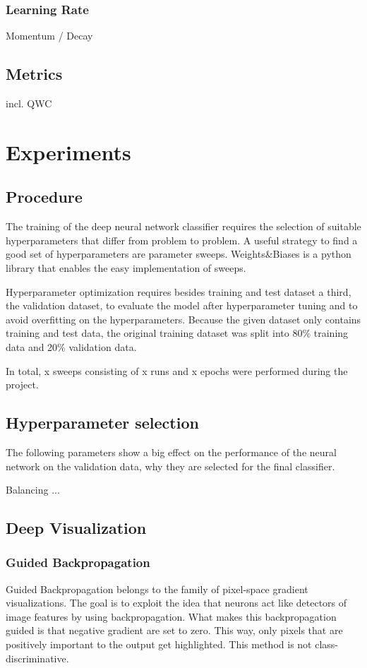 \documentclass{article}
\begin{document}
\subsubsection{Learning Rate}
Momentum / Decay

\subsection{Metrics}
incl. QWC
\section{Experiments}
\subsection{Procedure}
The training of the deep neural network classifier requires the selection of suitable hyperparameters that differ from
problem to problem. A useful strategy to find a good set of hyperparameters are parameter sweeps. Weights\&Biases is a 
python library that enables the easy implementation of sweeps. 

Hyperparameter optimization requires besides training and test dataset a third, the validation dataset, to evaluate the
model after hyperparameter tuning and to avoid overfitting on the hyperparameters. Because the given dataset only contains 
training and test data, the original training dataset was split into 80\% training data and 20\% validation data.

In total, x sweeps consisting of x runs and x epochs were performed during the project.

\subsection{Hyperparameter selection}
The following parameters show a big effect on the performance of the neural network on the validation data, 
why they are selected for the final classifier.

Balancing
...
\subsection{Deep Visualization}
\subsubsection{Guided Backpropagation}
Guided Backpropagation belongs to the family of pixel-space gradient visualizations. 
The goal is to exploit the idea that neurons act like detectors of image features by using backpropagation.
What makes this backpropagation guided is that negative gradient are set to zero. This way, only pixels that are positively important to 
the output get highlighted. This method is not class-discriminative.  
\end{document}
